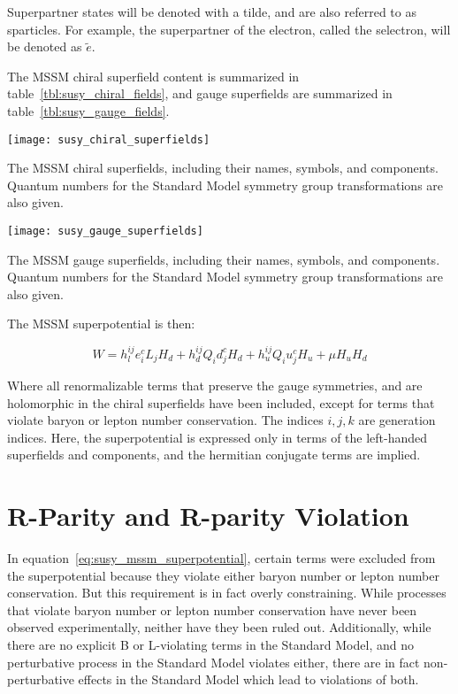 Superpartner states will be denoted with a tilde, and are also referred to as sparticles.
For example, the superpartner of the electron, called the selectron, will be denoted as $\tilde{e}$.

The MSSM chiral superfield content is summarized in table~\ref{tbl:susy_chiral_fields},
and gauge superfields are summarized in table~\ref{tbl:susy_gauge_fields}.

\begin{table}[!ht]\label{tbl:susy_chiral_fields}
    \centering


  \texttt{[image: susy\_chiral\_superfields]}
    \caption{The MSSM chiral superfields, including their names, symbols, and components.
  Quantum numbers for the Standard Model symmetry group transformations are also given.}\cite{susy-primer-1998}
\end{table}

\begin{table}[!ht]\label{tbl:susy_gauge_fields}
    \centering

  \texttt{[image: susy\_gauge\_superfields]}
    \caption{The MSSM gauge superfields, including their names, symbols, and components.
  Quantum numbers for the Standard Model symmetry group transformations are also given.}\cite{susy-primer-1998}
\end{table}

The MSSM superpotential is then:

\begin{equation}\label{eq:susy_mssm_superpotential}
    W = h_l^{ij} e_i^c L_j H_d + h_d^{ij} Q_i d_j^c H_d + h_u^{ij} Q_i u_j^c H_u + \mu H_u H_d
\end{equation}

Where all renormalizable terms that preserve the gauge symmetries, and are holomorphic in the chiral superfields have been included,
except for terms that violate baryon or lepton number conservation.
The indices $i, j, k$ are generation indices.
Here, the superpotential is expressed only in terms of the left-handed superfields and components,
and the hermitian conjugate terms are implied.

\section{R-Parity and R-parity Violation}\label{sec:susy_rpv}

In equation~\ref{eq:susy_mssm_superpotential}, certain terms were excluded from the superpotential because they
violate either baryon number or lepton number conservation.
But this requirement is in fact overly constraining.
While processes that violate baryon number or lepton number conservation have never been observed experimentally,
neither have they been ruled out.
Additionally, while there are no explicit B or L-violating terms in the Standard Model,
and no perturbative process in the Standard Model violates either,
there are in fact non-perturbative effects in the Standard Model which lead to violations of both.\cite{susy-bl-violation}

